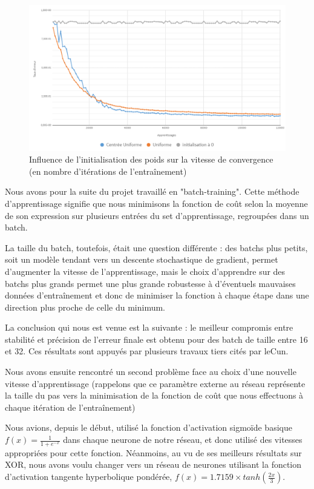\documentclass[
    10pt,
    a4paper,
    oneside,
    headinclude,footinclude,
    BCOR=5mm,
    captions=tableabove
]{scrartcl}
\begin{document}
\begin{figure}[h!]
\includegraphics[width=\linewidth]{initPoids.png}
\centering
\caption{Influence de l'initialisation des poids sur la vitesse de convergence (en nombre d'itérations de l'entraînement) }
\label{fig:initPoids.png}
\end{figure}

Nous avons pour la suite du projet travaillé en "batch-training". Cette méthode d'apprentissage signifie que nous minimisons la fonction de coût selon la moyenne de son expression sur plusieurs entrées du set d'apprentissage, regroupées dans un batch.

La taille du batch, toutefois, était une question différente : des batchs plus petits, soit un modèle tendant vers un descente stochastique de gradient, permet d'augmenter la vitesse de l'apprentissage, mais le choix d'apprendre sur des batchs plus grands permet une plus grande robustesse à d'éventuels mauvaises données d'entraînement et donc de minimiser la fonction à chaque étape dans une direction plus proche de celle du minimum.

La conclusion qui nous est venue est la suivante : le meilleur compromis entre stabilité et précision de l'erreur finale est obtenu pour des batch de taille entre 16 et 32. Ces résultats sont appuyés par plusieurs travaux tiers cités par leCun. %

Nous avons ensuite rencontré un second problème face au choix d'une nouvelle vitesse d'apprentissage (rappelons que ce paramètre externe au réseau représente la taille du pas vers la minimisation de la fonction de coût que nous effectuons à chaque itération de l'entraînement)

Nous avions, depuis le début, utilisé la fonction d'activation sigmoïde basique $f(x) = \frac{1}{1 + e^{-x}}$ dans chaque neurone de notre réseau, et donc utilisé des vitesses appropriées pour cette fonction.
Néanmoins, au vu de ses meilleurs résultats sur XOR, nous avons voulu changer vers un réseau de neurones utilisant  la fonction d'activation tangente hyperbolique pondérée, $f(x) = 1.7159 \times tanh(\frac{2x}{3})$.
\end{document}
